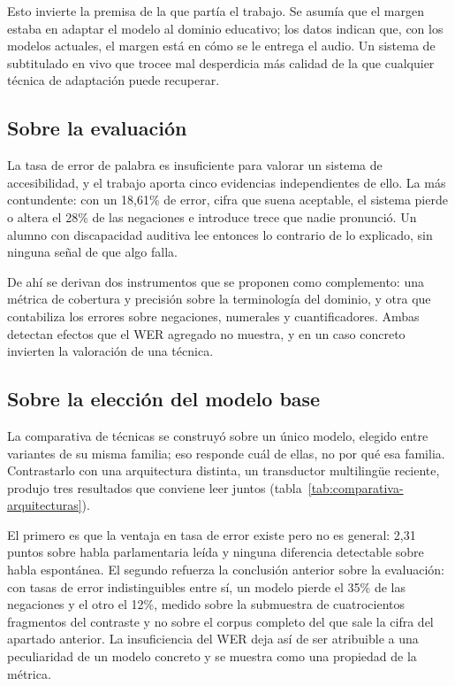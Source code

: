 Esto invierte la premisa de la que partía el trabajo. Se asumía que el margen estaba en
adaptar el modelo al dominio educativo; los datos indican que, con los modelos actuales, el
margen está en cómo se le entrega el audio. Un sistema de subtitulado en vivo que trocee
mal desperdicia más calidad de la que cualquier técnica de adaptación puede recuperar.

\subsection{Sobre la evaluación}

La tasa de error de palabra es insuficiente para valorar un sistema de accesibilidad, y el
trabajo aporta cinco evidencias independientes de ello. La más contundente: con un 18,61\%
de error, cifra que suena aceptable, el sistema pierde o altera el 28\% de las negaciones e
introduce trece que nadie pronunció. Un alumno con discapacidad auditiva lee entonces lo
contrario de lo explicado, sin ninguna señal de que algo falla.

De ahí se derivan dos instrumentos que se proponen como complemento: una métrica de
cobertura y precisión sobre la terminología del dominio, y otra que contabiliza los errores
sobre negaciones, numerales y cuantificadores. Ambas detectan efectos que el WER agregado
no muestra, y en un caso concreto invierten la valoración de una técnica.

\subsection{Sobre la elección del modelo base}

La comparativa de técnicas se construyó sobre un único modelo, elegido entre variantes de
su misma familia; eso responde cuál de ellas, no por qué esa familia. Contrastarlo con una
arquitectura distinta, un transductor multilingüe reciente, produjo tres resultados que
conviene leer juntos (tabla~\ref{tab:comparativa-arquitecturas}).

El primero es que la ventaja en tasa de error existe pero no es general: 2,31 puntos sobre
habla parlamentaria leída y ninguna diferencia detectable sobre habla espontánea. El
segundo refuerza la conclusión anterior sobre la evaluación: con tasas de error
indistinguibles entre sí, un modelo pierde el 35\% de las negaciones y el otro el 12\%,
medido sobre la submuestra de cuatrocientos fragmentos del contraste y no sobre el corpus
completo del que sale la cifra del apartado anterior. La insuficiencia del WER deja así de
ser atribuible a una peculiaridad de un modelo concreto y se muestra como una propiedad de
la métrica.

